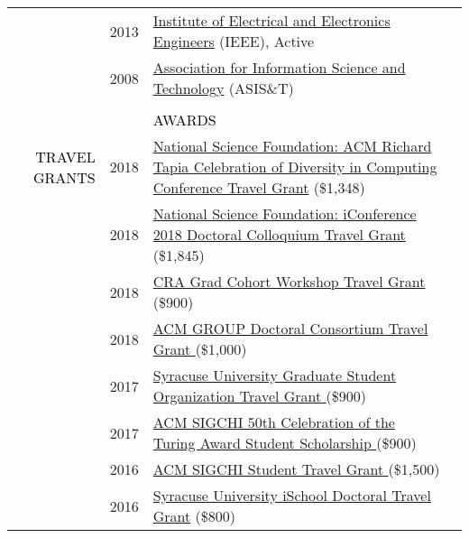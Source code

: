 \documentclass[12pt]{article}
\begin{document}
{{\begin{longtable}{Rp{1.0in}p{0.25in}p{4.75in}}
& \footnotesize{2013} & \href{https://www.ieee.org/}{{Institute of Electrical and Electronics Engineers}} (IEEE), Active \\

& \footnotesize{2008} & \href{https://www.asist.org/}{{Association for Information Science and Technology}} (ASIS\&T)
\bigskip \\

\\

&&\par \Large \textcolor{black}{\uppercase{Awards}}\\ \hhline{~~-}

\textcolor{black}{\footnotesize{\uppercase{Travel Grants}}} & \footnotesize{2018} & \href{https://www.nsf.gov/awardsearch/showAward?AWD_ID=1823052}{{National Science Foundation: ACM Richard Tapia Celebration of Diversity in Computing Conference Travel Grant}} (\$1,348) \\

& \footnotesize{2018} & \href{https://www.nsf.gov/awardsearch/showAward?AWD_ID=1713738}{{National Science Foundation: iConference 2018 Doctoral Colloquium Travel Grant}} (\$1,845) \\

& \footnotesize{2018} & \href{https://cra.org/events/urmgradcohort/}{{CRA Grad Cohort Workshop Travel Grant} }(\$900) \\

& \footnotesize{2018} & \href{https://dl.acm.org/citation.cfm?id=3148330}{{ACM GROUP Doctoral Consortium Travel Grant} }(\$1,000) \\

& \footnotesize{2017} & \href{http://gradorg.syr.edu/}{{Syracuse University Graduate Student Organization Travel Grant} }(\$900) \\

& \footnotesize{2017} & \href{http://www.sigchi.org/news/sigchi-sponsors-students-to-attend-turing-award-celebration}{{ACM SIGCHI 50th Celebration of the Turing Award Student Scholarship} }(\$900) \\

& \footnotesize{2016} & \href{http://www.sigchi.org/conferences/funding/student-travel-grant}{{ACM SIGCHI Student Travel Grant} }(\$1,500) \\

& \footnotesize{2016} & \href{https://ischool.syr.edu/research/grants-and-awards/}{{Syracuse University iSchool Doctoral Travel Grant}} (\$800) \\


\end{longtable}}}
\end{document}
